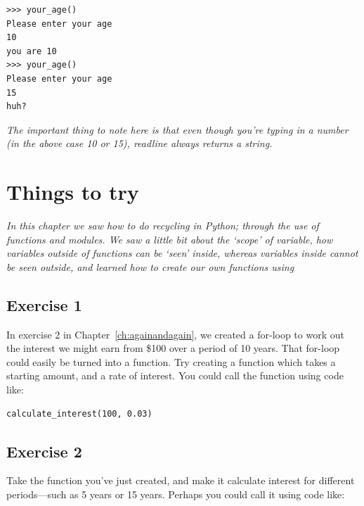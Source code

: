 \begin{listingignore}
\begin{verbatim}
>>> your_age()
Please enter your age
10
you are 10
>>> your_age()
Please enter your age
15
huh?
\end{verbatim}
\end{listingignore}

\noindent
\emph{The important thing to note here is that even though you're typing in a number (in the above case 10 or 15), readline always returns a string.}


\section{Things to try}

\emph{In this chapter we saw how to do recycling in Python; through the use of functions and modules.  We saw a little bit about the `scope' of variable, how variables outside of functions can be `seen' inside, whereas variables inside cannot be seen outside, and learned how to create our own functions using }

\subsection*{Exercise 1}
In exercise 2 in Chapter~\ref{ch:againandagain}, we created a for-loop to work out the interest we might earn from \$100 over a period of 10 years.  That for-loop could easily be turned into a function.  Try creating a function which takes a starting amount, and a rate of interest.  You could call the function using code like:

\begin{listing}
\begin{verbatim}
calculate_interest(100, 0.03)
\end{verbatim}
\end{listing}

\subsection*{Exercise 2}
Take the function you've just created, and make it calculate interest for different periods---such as 5 years or 15 years.  Perhaps you could call it using code like:

